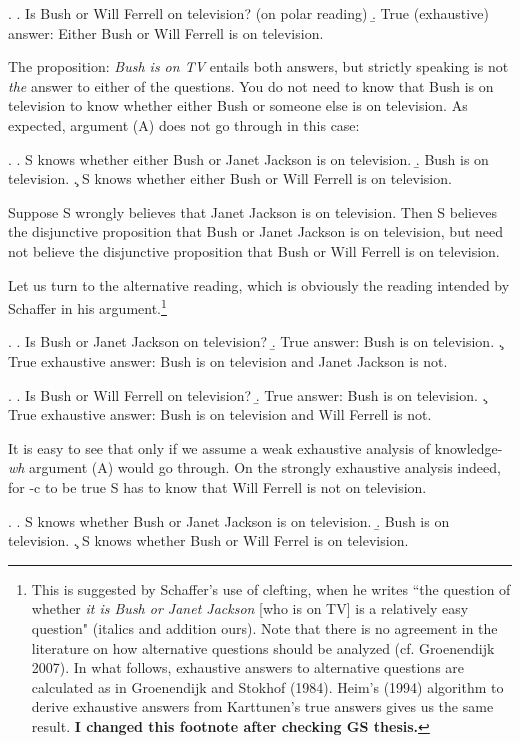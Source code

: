 \ex. \a.  Is   Bush or Will Ferrell on television?  (on polar
reading)
\b. True (exhaustive) answer: Either Bush or Will Ferrell
is on television.



\noindent The proposition: {\it Bush is on TV} entails both
answers, but strictly speaking is  not \emph{the} answer to either
of the questions. You do not need to know that Bush is on
television to know whether either Bush or someone else is on
television. As expected, argument (A) does not go through in this
case:

\ex.  \a. S knows whether  either Bush or Janet Jackson is on
television.
 \b. Bush is on television.
 \c. S knows  whether either Bush or  Will Ferrell is on television.

Suppose S wrongly believes that Janet Jackson is on television.
Then S believes the disjunctive proposition that Bush or Janet
Jackson is on television, but need not believe the disjunctive
proposition that Bush or  Will Ferrell is on television.


Let us turn to the alternative reading, which is obviously the
reading intended by Schaffer in his argument.\footnote{This is
suggested by Schaffer's use of clefting, when he writes ``the
question of whether \emph{it is Bush or Janet Jackson} [who is on
TV] is a relatively easy question" (italics and addition ours).
Note that there is no agreement in the literature on how
alternative questions should be analyzed (cf. Groenendijk 2007).   In what
follows,   exhaustive answers to alternative questions are  calculated as in Groenendijk and Stokhof (1984).  Heim's (1994) algorithm to derive exhaustive answers from
Karttunen's true answers gives us the same result. {\bf I changed this footnote after checking GS thesis.}}

\ex. \label{jackson} \a.  Is Bush or Janet Jackson on television?
\b. True answer: Bush is on television. \c. True exhaustive
answer: Bush is on television and Janet Jackson is not.

\ex. \label{ferrell} \a.  Is Bush or Will Ferrell on television?
\b. True answer: Bush is on television. \c. True exhaustive
answer: Bush is on television and Will Ferrell is not.

It is easy to see that only if we assume a weak exhaustive
analysis of knowledge-\emph{wh} argument (A) would go through. On
the strongly exhaustive analysis indeed, for \Next-c to be true S
has to know that Will Ferrell is not on television.

\ex.  \a. S knows whether Bush or Janet Jackson is on television.
 \b. Bush is on television.
 \c. S knows  whether  Bush or  Will Ferrel is on television.

